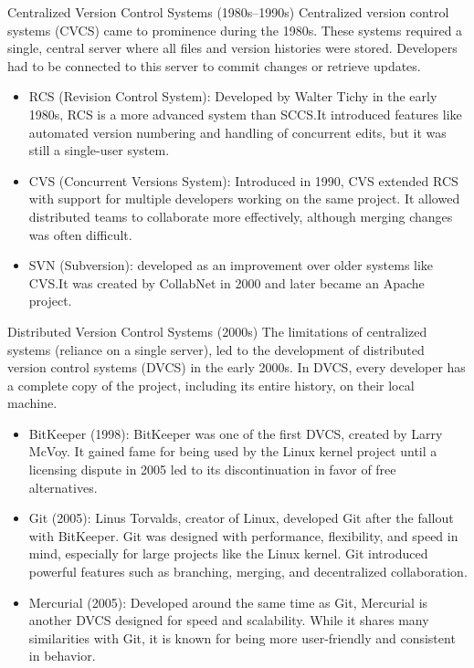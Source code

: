 \documentclass{beamer}
\begin{document}
\begin{frame}{Centralized Version Control Systems (1980s--1990s)}
  Centralized version control systems (CVCS) came to prominence during the 1980s. These systems required a single, central server where all files and version histories were stored. Developers had to be connected to this server to commit changes or retrieve updates.
  \begin{itemize}
    \item RCS (Revision Control System): Developed by Walter Tichy in the early 1980s, RCS is a more advanced system than SCCS.\@ It introduced features like automated version numbering and handling of concurrent edits, but it was still a single-user system.
    \item CVS (Concurrent Versions System): Introduced in 1990, CVS extended RCS with support for multiple developers working on the same project. It allowed distributed teams to collaborate more effectively, although merging changes was often difficult.
    \item SVN (Subversion): developed as an improvement over older systems like CVS.\@ It was created by CollabNet in 2000 and later became an Apache project.
  \end{itemize}
\end{frame}

\begin{frame}{Distributed Version Control Systems (2000s)}
  The limitations of centralized systems (reliance on a single server), led to the development of distributed version control systems (DVCS) in the early 2000s. In DVCS, every developer has a complete copy of the project, including its entire history, on their local machine.
  \begin{itemize}
    \item BitKeeper (1998): BitKeeper was one of the first DVCS, created by Larry McVoy. It gained fame for being used by the Linux kernel project until a licensing dispute in 2005 led to its discontinuation in favor of free alternatives.
    \item Git (2005): Linus Torvalds, creator of Linux, developed Git after the fallout with BitKeeper. Git was designed with performance, flexibility, and speed in mind, especially for large projects like the Linux kernel. Git introduced powerful features such as branching, merging, and decentralized collaboration.
    \item Mercurial (2005): Developed around the same time as Git, Mercurial is another DVCS designed for speed and scalability. While it shares many similarities with Git, it is known for being more user-friendly and consistent in behavior.
  \end{itemize}
\end{frame}
\end{document}
